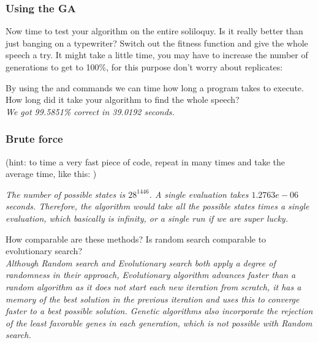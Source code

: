 \documentclass{article}
\begin{document}
\subsubsection{Using the GA}
Now time to test your algorithm on the entire soliloquy. Is it really better than just banging on a typewriter? Switch out the fitness function and give the whole speech a try. It might take a little time, you may have to increase the number of generations to get to 100\%, for this purpose don't worry about replicates:



By using the  and  commands we can time how long a program takes to execute. How long did it take your algorithm to find the whole speech?\\
\textit{
\color{blue} We got 99.5851\% correct in 39.0192 seconds.
}

\newpage
\subsubsection{Brute force}

(hint: to time a very fast piece of code, repeat in many times and take the average time, like this: )



\textit{
\color{blue}The number of possible states is $28^{1446}$. A single evaluation takes $1.2763e-06$ seconds. Therefore, the algorithm would take all the possible states times a single evaluation, which basically is infinity, or a single run if we are super lucky. 
}

\vspace{2cm}
How comparable are these methods? Is random search comparable to evolutionary search?\\
\textit{
\color{blue}Although Random search and Evolutionary search both apply a degree of randomness in their approach, Evolutionary algorithm advances faster than a random algorithm as it does not start each new iteration from scratch, it has a memory of the best solution in the previous iteration and uses this to converge faster to a best possible solution. Genetic algorithms also incorporate the rejection of the least favorable genes in each generation, which is not possible with Random search.
}
\end{document}
